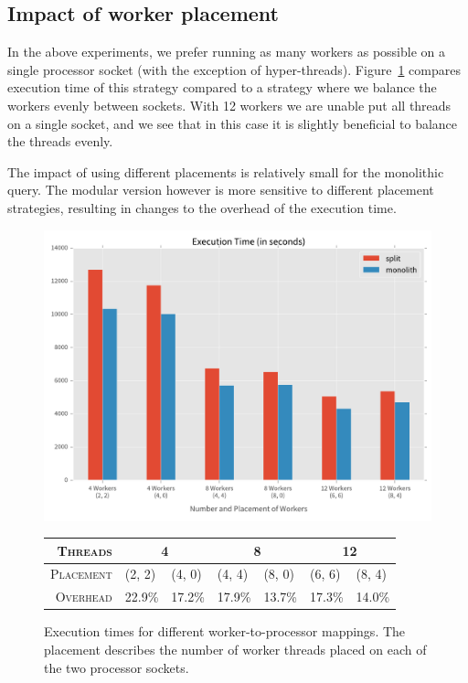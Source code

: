 \subsection{Impact of worker placement} \label{sec:evalnuma}

In the above experiments, we prefer running as many workers as possible
on a single processor socket (with the exception of hyper-threads).
Figure~\ref{fig:numa} compares execution time of this strategy compared to a
strategy where we balance the workers evenly between sockets. With 12 workers
we are unable put all threads on a single socket, and we see that in this case
it is slightly beneficial to balance the threads evenly.

The impact of using different placements is relatively small for the
monolithic query. The modular version however is more sensitive to
different placement strategies, resulting in changes to the overhead
of the execution time. 

\begin{figure}[h]
  \centering
    \includegraphics[width=1\textwidth]{figures/evaluation/numa}

    {\footnotesize
    \vspace{1em}
    \begin{tabularx}{\textwidth}{ r|XX|XX|XX }
      \hline 
      \textsc{Threads} & \multicolumn{2}{c|}{4} & \multicolumn{2}{c|}{8} & \multicolumn{2}{c}{12} \\
      \hline 
      \textsc{Placement} & (2, 2)&(4, 0)&(4, 4)&(8, 0)&(6, 6)&(8, 4)\\
      \hline 
      \textsc{Overhead} & 22.9\%&17.2\%&17.9\%&13.7\%&17.3\%&14.0\% \\
      \hline
    \end{tabularx}
    }
    \caption[Execution time for different of worker placement]{Execution times for
    different worker-to-processor mappings. The placement describes the number of
    worker threads placed on each of the two processor sockets.}
    \label{fig:numa}
\end{figure}

